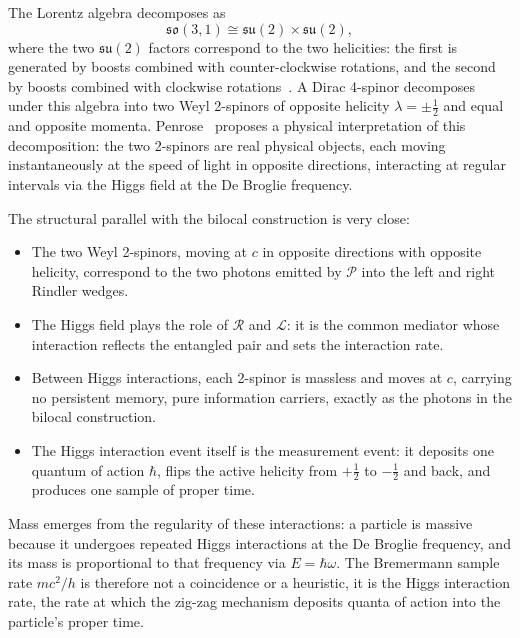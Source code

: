 \documentclass[12pt,a4paper]{article}
\begin{document}
The Lorentz algebra decomposes as
\begin{equation}
    \mathfrak{so}(3,1) \cong \mathfrak{su}(2) \times \mathfrak{su}(2),
\end{equation}
where the two $\mathfrak{su}(2)$ factors correspond to the two helicities: the first is
generated by boosts combined with counter-clockwise rotations, and the second by boosts
combined with clockwise rotations~\cite{ryder1996quantum}. A Dirac 4-spinor decomposes under this
algebra into two Weyl 2-spinors of opposite helicity $\lambda = \pm\frac{1}{2}$ and
equal and opposite momenta. Penrose~\cite{penrose2006road} proposes a physical interpretation
of this decomposition: the two 2-spinors are real physical objects, each moving
instantaneously at the speed of light in opposite directions, interacting at regular
intervals via the Higgs field at the De Broglie frequency.

The structural parallel with the bilocal construction is very close:

\begin{itemize}
    \item The two Weyl 2-spinors, moving at $c$ in opposite directions with opposite
    helicity, correspond to the two photons emitted by $\mathcal{P}$ into the left and right
    Rindler wedges.
    \item The Higgs field plays the role of $\mathcal{R}$ and $\mathcal{L}$: it is the common mediator whose
    interaction reflects the entangled pair and sets the interaction rate.
    \item Between Higgs interactions, each 2-spinor is massless and moves at $c$,
    carrying no persistent memory, pure information carriers, exactly as the photons
    in the bilocal construction.
    \item The Higgs interaction event itself is the measurement event: it deposits one
    quantum of action $\hbar$, flips the active helicity from $+\frac{1}{2}$ to
    $-\frac{1}{2}$ and back, and produces one sample of proper time.
\end{itemize}

Mass emerges from the regularity of these interactions: a particle is massive because it
undergoes repeated Higgs interactions at the De Broglie frequency, and its mass is
proportional to that frequency via $E = \hbar\omega$. The Bremermann sample rate $mc^2/h$
is therefore not a coincidence or a heuristic, it is the Higgs interaction rate,
the rate at which the zig-zag mechanism deposits quanta of action into the particle's
proper time.
\end{document}
